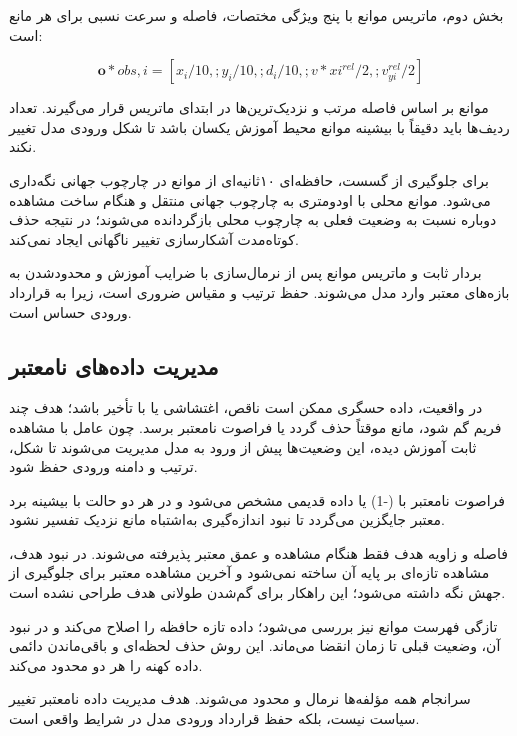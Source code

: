 بخش دوم، ماتریس موانع با پنج ویژگی مختصات، فاصله و سرعت نسبی برای هر مانع است:

\begin{equation}
	\mathbf{o}*{obs,i} =
	[
	x_i/10,;
	y_i/10,;
	d_i/10,;
	v*{xi}^{rel}/2,;
	v_{yi}^{rel}/2
	]
	\label{eq:real_obstacle_observation_vector}
\end{equation}

موانع بر اساس فاصله مرتب و نزدیک‌ترین‌ها در ابتدای ماتریس قرار می‌گیرند. تعداد ردیف‌ها باید دقیقاً با بیشینه موانع محیط آموزش یکسان باشد تا شکل ورودی مدل تغییر نکند.

برای جلوگیری از گسست، حافظه‌ای ۱۰ثانیه‌ای از موانع در چارچوب جهانی نگه‌داری می‌شود. موانع محلی با اودومتری به چارچوب جهانی منتقل و هنگام ساخت مشاهده دوباره نسبت به وضعیت فعلی به چارچوب محلی بازگردانده می‌شوند؛ در نتیجه حذف کوتاه‌مدت آشکارسازی تغییر ناگهانی ایجاد نمی‌کند.

بردار ثابت و ماتریس موانع پس از نرمال‌سازی با ضرایب آموزش و محدودشدن به بازه‌های معتبر وارد مدل می‌شوند. حفظ ترتیب و مقیاس ضروری است، زیرا  به قرارداد ورودی حساس است.

\subsection{مدیریت داده‌های نامعتبر}
\label{subsec:real_invalid_data_handling}

در واقعیت، داده حسگری ممکن است ناقص، اغتشاشی یا با تأخیر باشد؛ هدف چند فریم گم شود، مانع موقتاً حذف گردد یا فراصوت نامعتبر برسد. چون عامل با مشاهده ثابت آموزش دیده، این وضعیت‌ها پیش از ورود به مدل مدیریت می‌شوند تا شکل، ترتیب و دامنه ورودی حفظ شود.

فراصوت نامعتبر با (-1) یا داده قدیمی مشخص می‌شود و در هر دو حالت با بیشینه برد معتبر جایگزین می‌گردد تا نبود اندازه‌گیری به‌اشتباه مانع نزدیک تفسیر نشود.

فاصله و زاویه هدف فقط هنگام مشاهده  و عمق معتبر پذیرفته می‌شوند. در نبود هدف، مشاهده تازه‌ای بر پایه آن ساخته نمی‌شود و آخرین مشاهده معتبر برای جلوگیری از جهش نگه داشته می‌شود؛ این راهکار برای گم‌شدن طولانی هدف طراحی نشده است.

تازگی فهرست موانع نیز بررسی می‌شود؛ داده تازه حافظه را اصلاح می‌کند و در نبود آن، وضعیت قبلی تا زمان انقضا می‌ماند. این روش حذف لحظه‌ای و باقی‌ماندن دائمی داده کهنه را هر دو محدود می‌کند.

سرانجام همه مؤلفه‌ها نرمال و محدود می‌شوند. هدف مدیریت داده نامعتبر تغییر سیاست نیست، بلکه حفظ قرارداد ورودی مدل در شرایط واقعی است.

